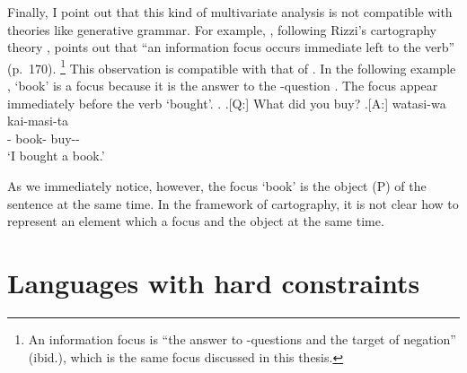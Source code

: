 
Finally, I point out that this kind of multivariate analysis
is not compatible with theories like generative grammar.
For example,
, following Rizzi's cartography theory \cite[e.g.,][]{rizzi97,rizzi04},
points out that ``an information focus occurs immediate left to the verb'' (p.~170).%
 \footnote{
 An information focus is ``the answer to -questions and the target of negation'' (ibid.),
 which is the same focus discussed in this thesis.
 }
This observation is compatible with that of .
In the following example \Next[A],
 `book' is a focus because it is the answer to the -question \Next[Q].
The focus appear immediately before the verb  `bought'.
%
\ex.
 \a.[Q:] What did you buy?
 \bg.[A:] watasi-wa  kai-masi-ta \\
          - book- buy-- \\
          `I bought a book.'
  \hfill{\cite[170--171]{endo14}}

As we immediately notice, however,
the focus  `book' is the object (P) of the sentence at the same time.
In the framework of cartography,
it is not clear how to represent an element which a focus and the object
at the same time.





\section{Languages with hard constraints}\label{Disc:HardConst}

